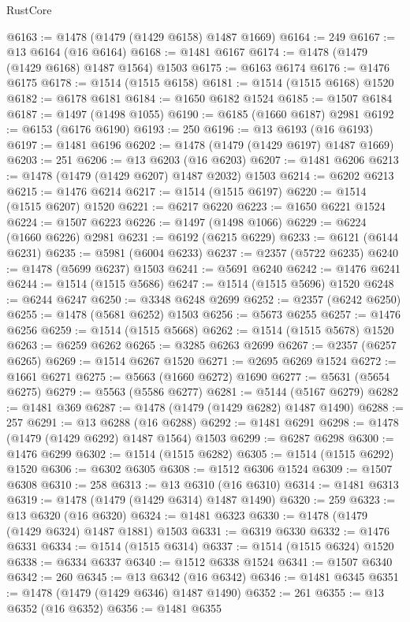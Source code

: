 \begin{lexlean}{RustCore}
\begin{coremodule}
@6163 := @1478 (@1479 (@1429 @6158) @1487 @1669)
@6164 := 249
@6167 := @13 @6164 (@16 @6164)
@6168 := @1481 @6167
@6174 := @1478 (@1479 (@1429 @6168) @1487 @1564) @1503
@6175 := @6163 @6174
@6176 := @1476 @6175
@6178 := @1514 (@1515 @6158)
@6181 := @1514 (@1515 @6168) @1520
@6182 := @6178 @6181
@6184 := @1650 @6182 @1524
@6185 := @1507 @6184
@6187 := @1497 (@1498 @1055)
@6190 := @6185 (@1660 @6187) @2981
@6192 := @6153 (@6176 @6190)
@6193 := 250
@6196 := @13 @6193 (@16 @6193)
@6197 := @1481 @6196
@6202 := @1478 (@1479 (@1429 @6197) @1487 @1669)
@6203 := 251
@6206 := @13 @6203 (@16 @6203)
@6207 := @1481 @6206
@6213 := @1478 (@1479 (@1429 @6207) @1487 @2032) @1503
@6214 := @6202 @6213
@6215 := @1476 @6214
@6217 := @1514 (@1515 @6197)
@6220 := @1514 (@1515 @6207) @1520
@6221 := @6217 @6220
@6223 := @1650 @6221 @1524
@6224 := @1507 @6223
@6226 := @1497 (@1498 @1066)
@6229 := @6224 (@1660 @6226) @2981
@6231 := @6192 (@6215 @6229)
@6233 := @6121 (@6144 @6231)
@6235 := @5981 (@6004 @6233)
@6237 := @2357 (@5722 @6235)
@6240 := @1478 (@5699 @6237) @1503
@6241 := @5691 @6240
@6242 := @1476 @6241
@6244 := @1514 (@1515 @5686)
@6247 := @1514 (@1515 @5696) @1520
@6248 := @6244 @6247
@6250 := @3348 @6248 @2699
@6252 := @2357 (@6242 @6250)
@6255 := @1478 (@5681 @6252) @1503
@6256 := @5673 @6255
@6257 := @1476 @6256
@6259 := @1514 (@1515 @5668)
@6262 := @1514 (@1515 @5678) @1520
@6263 := @6259 @6262
@6265 := @3285 @6263 @2699
@6267 := @2357 (@6257 @6265)
@6269 := @1514 @6267 @1520
@6271 := @2695 @6269 @1524
@6272 := @1661 @6271
@6275 := @5663 (@1660 @6272) @1690
@6277 := @5631 (@5654 @6275)
@6279 := @5563 (@5586 @6277)
@6281 := @5144 (@5167 @6279)
@6282 := @1481 @369
@6287 := @1478 (@1479 (@1429 @6282) @1487 @1490)
@6288 := 257
@6291 := @13 @6288 (@16 @6288)
@6292 := @1481 @6291
@6298 := @1478 (@1479 (@1429 @6292) @1487 @1564) @1503
@6299 := @6287 @6298
@6300 := @1476 @6299
@6302 := @1514 (@1515 @6282)
@6305 := @1514 (@1515 @6292) @1520
@6306 := @6302 @6305
@6308 := @1512 @6306 @1524
@6309 := @1507 @6308
@6310 := 258
@6313 := @13 @6310 (@16 @6310)
@6314 := @1481 @6313
@6319 := @1478 (@1479 (@1429 @6314) @1487 @1490)
@6320 := 259
@6323 := @13 @6320 (@16 @6320)
@6324 := @1481 @6323
@6330 := @1478 (@1479 (@1429 @6324) @1487 @1881) @1503
@6331 := @6319 @6330
@6332 := @1476 @6331
@6334 := @1514 (@1515 @6314)
@6337 := @1514 (@1515 @6324) @1520
@6338 := @6334 @6337
@6340 := @1512 @6338 @1524
@6341 := @1507 @6340
@6342 := 260
@6345 := @13 @6342 (@16 @6342)
@6346 := @1481 @6345
@6351 := @1478 (@1479 (@1429 @6346) @1487 @1490)
@6352 := 261
@6355 := @13 @6352 (@16 @6352)
@6356 := @1481 @6355

\end{coremodule}
\end{lexlean}
